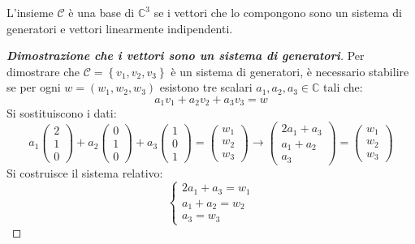 \documentclass[a4paper]{article}
\begin{document}
	\noindent
	L'insieme $\mathscr{C}$ è una base di $\mathbb{C}^{3}$ se i vettori che lo compongono sono un sistema di generatori e vettori linearmente indipendenti.
	
	\begin{proof}[\textbf{Dimostrazione che i vettori sono un sistema di generatori}]
		Per dimostrare che $\mathscr{C} = \left\{v_{1}, v_{2}, v_{3}\right\}$ è un sistema di generatori, è necessario stabilire se per ogni $w = \left(w_{1}, w_{2}, w_{3}\right)$ esistono tre scalari $a_{1}, a_{2}, a_{3} \in \mathbb{C}$ tali che:
		\begin{equation*}
			a_{1}v_{1} + a_{2}v_{2} + a_{3}v_{3} = w
		\end{equation*}
		Si sostituiscono i dati:
		\begin{equation*}
			a_{1} \begin{pmatrix}
				2 \\ 1 \\ 0
			\end{pmatrix} + a_{2} \begin{pmatrix}
				0 \\ 1 \\ 0
			\end{pmatrix} + a_{3} \begin{pmatrix}
				1 \\ 0 \\ 1
			\end{pmatrix} = \begin{pmatrix}
				w_{1} \\ w_{2} \\ w_{3}
			\end{pmatrix} \longrightarrow
			\begin{pmatrix}
				2a_{1} + a_{3} \\
				a_{1}  + a_{2} \\
				a_{3}
			\end{pmatrix} = \begin{pmatrix}
				w_{1} \\ w_{2} \\ w_{3}
			\end{pmatrix}
		\end{equation*}
		Si costruisce il sistema relativo:
		\begin{equation*}
			\begin{cases}
				2a_{1} + a_{3} = w_{1} \\
				a_{1}  + a_{2} = w_{2}\\
				a_{3} = w_{3}
			\end{cases}

\end{equation*}
\end{proof}
\end{document}
